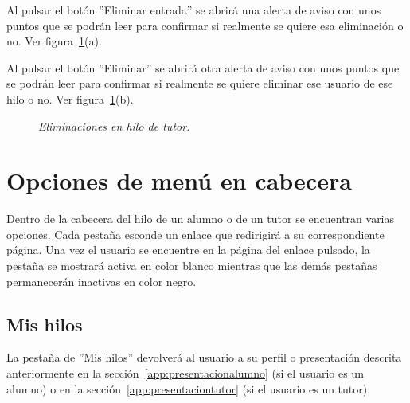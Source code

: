 \documentclass[a4paper, 12pt]{book}
\begin{document}
Al pulsar el bot\'on ''Eliminar entrada'' se abrir\'a una alerta de aviso con unos puntos que se podr\'an leer para confirmar si realmente se quiere esa 
eliminaci\'on o no. Ver figura~\ref{figura:hiloprofesor1}(a).

Al pulsar el bot\'on ''Eliminar'' se abrir\'a otra alerta de aviso con unos puntos que se podr\'an leer para confirmar si realmente se quiere eliminar ese
usuario de ese hilo o no. Ver figura~\ref{figura:hiloprofesor1}(b).
\begin{figure}
  \centering
  \caption{\textit{Eliminaciones en hilo de tutor.}}
  \label{figura:hiloprofesor1}
\end{figure}

\section{Opciones de men\'u en cabecera}
Dentro de la cabecera del hilo de un alumno o de un tutor se encuentran varias opciones. Cada pesta\~na esconde un enlace que redirigir\'a a su 
correspondiente p\'agina. Una vez el usuario se encuentre en la p\'agina del enlace pulsado, la pesta\~na se mostrar\'a activa en color blanco mientras que 
las dem\'as pesta\~nas permanecer\'an inactivas en color negro.

\subsection{Mis hilos}
La pesta\~na de ''Mis hilos'' devolver\'a al usuario a su perfil o presentaci\'on descrita anteriormente en la secci\'on~\ref{app:presentacionalumno} (si el usuario
es un alumno) o en la secci\'on~\ref{app:presentaciontutor} (si el usuario es un tutor).
\end{document}
